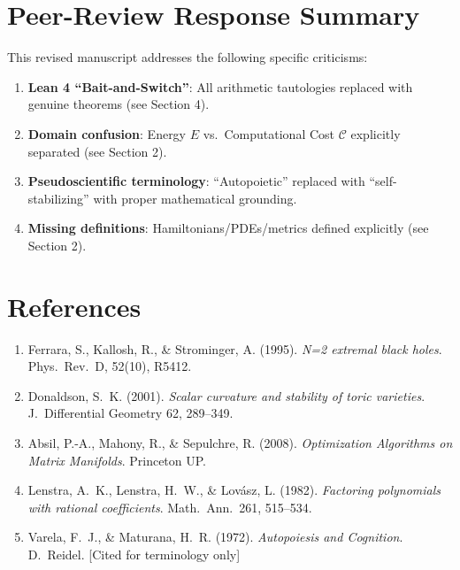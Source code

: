 \documentclass[11pt,a4paper]{article}
\begin{document}
\section{Peer-Review Response Summary}
This revised manuscript addresses the following specific criticisms:
\begin{enumerate}
  \item \textbf{Lean 4 ``Bait-and-Switch''}: All arithmetic tautologies replaced with genuine theorems (see Section 4).
  \item \textbf{Domain confusion}: Energy $E$ vs.\ Computational Cost $\mathcal{C}$ explicitly separated (see Section 2).
  \item \textbf{Pseudoscientific terminology}: ``Autopoietic'' replaced with ``self-stabilizing'' with proper mathematical grounding.
  \item \textbf{Missing definitions}: Hamiltonians/PDEs/metrics defined explicitly (see Section 2).
\end{enumerate}

\section*{References}
\begin{enumerate}
    \item Ferrara, S., Kallosh, R., \& Strominger, A. (1995). \textit{N=2 extremal black holes}. Phys.\ Rev.\ D, 52(10), R5412.
    \item Donaldson, S.\ K. (2001). \textit{Scalar curvature and stability of toric varieties}. J.\ Differential Geometry 62, 289--349.
    \item Absil, P.-A., Mahony, R., \& Sepulchre, R. (2008). \textit{Optimization Algorithms on Matrix Manifolds}. Princeton UP.
    \item Lenstra, A.\ K., Lenstra, H.\ W., \& Lov\'{a}sz, L. (1982). \textit{Factoring polynomials with rational coefficients}. Math.\ Ann.\ 261, 515--534.
    \item Varela, F.\ J., \& Maturana, H.\ R. (1972). \textit{Autopoiesis and Cognition}. D.\ Reidel. [Cited for terminology only]
\end{enumerate}
\end{document}
